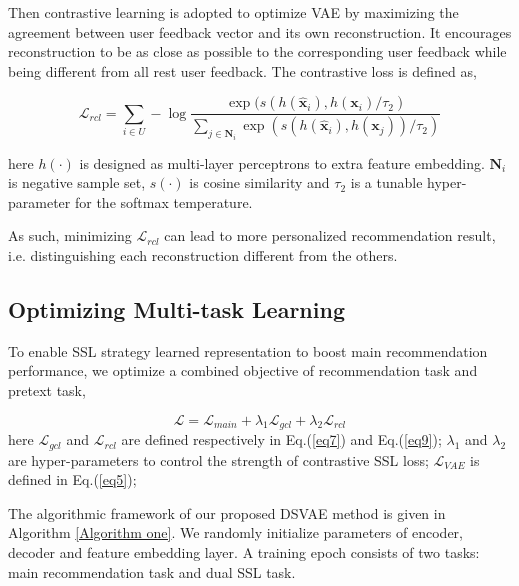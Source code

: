 Then contrastive learning is adopted to optimize VAE by maximizing the agreement between user feedback vector and its own reconstruction. It encourages reconstruction to be as close as possible to the corresponding user feedback while being different from all rest user feedback. The contrastive loss is defined as,

\begin{equation}
\mathcal{L}_{rcl} = \sum_{i\in U}-\log\frac{\exp(s(h\left(\hat{\mathbf{x}}_i\right),h\left(\mathbf{x}_i\right)/\tau_2)}{\sum_{j\in \mathbf{N}_i} \exp(s(h\left(\hat{\mathbf{x}}_i\right),h\left(\mathbf{x}_j\right))/\tau_2)}
\label{eq9}
\end{equation}

here $h(\cdot)$ is designed as multi-layer perceptrons to extra feature embedding. $\mathbf{N}_i$ is negative sample set, $s(\cdot) $ is cosine similarity and $\tau_2$ is a tunable hyper-parameter for the softmax temperature. 

As  such, minimizing $\mathcal{L}_{rcl}$ can lead to more personalized recommendation result, i.e. distinguishing each reconstruction different from the others.

\subsection{Optimizing Multi-task Learning}\label{35}
To enable SSL strategy learned representation to boost main recommendation performance, we optimize a combined objective of recommendation task and pretext task,


\begin{equation}
\mathcal{L} = \mathcal{L}_{main} + \lambda_1 \mathcal{L}_{gcl} + \lambda_2 \mathcal{L}_{rcl}
\label{eq10}
\end{equation}
here $\mathcal{L}_{gcl}$ and $\mathcal{L}_{rcl}$ are defined respectively in Eq.(\ref{eq7}) and Eq.(\ref{eq9}); $\lambda_1$ and $\lambda_2$ are hyper-parameters to control the strength of contrastive SSL loss; $\mathcal{L}_{VAE}$ is defined in Eq.(\ref{eq5}); 

The algorithmic framework of our proposed DSVAE method is given in Algorithm \ref{Algorithm one}. We randomly initialize parameters of encoder, decoder and feature embedding layer. A training epoch consists of two tasks: main recommendation task and dual SSL task.


